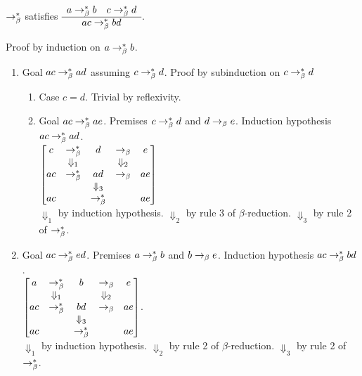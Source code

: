 \begin{theorem}
  $\to^*_\beta$ satisfies
  $\begin{array}{c} 
    a\to^*_\beta b \quad
    c \to^*_\beta d \\ \hline ac \to^*_\beta bd\end{array}$.

Proof by induction on $a \to^*_\beta b$.
\begin{enumerate}
\item
  Goal $ac \to^*_\beta ad$ assuming $c  \to^*_\beta d$.
  Proof by subinduction on $c \to^*_\beta d$
  \begin{enumerate}
  \item
    Case $c = d$. Trivial by reflexivity.
  \item
    Goal $ac \to^*_\beta ae$.
    Premises $c \to^*_\beta d$ and $d \to_\beta e$.
    Induction hypothesis $ac \to^*_\beta ad$.\\
    $\begin{bmatrix}
      c   & \to^*_\beta      &  d     & \to_\beta            &   e   \\
           & \Downarrow_1 &         & \Downarrow_2 &        \\
      ac & \to^*_\beta      &  ad   & \to_\beta             &   ae \\
          &                         & \Downarrow_3 &          &        \\
      ac &                        & \to^*_\beta   &              &   ae
    \end{bmatrix}$\\
    $\Downarrow_1$ by induction hypothesis.
    $\Downarrow_2$ by rule 3 of $\beta$-reduction.
    $\Downarrow_3$ by rule 2 of $\to^*_\beta$.
  \end{enumerate}
\item
  Goal $ac \to^*_\beta ed$.
  Premises $a \to^*_\beta b$ and $b\to_\beta e$.
  Induction hypothesis $ac \to^*_\beta bd$.\\
    $\begin{bmatrix}
      a   & \to^*_\beta      &  b     & \to_\beta            &   e   \\
           & \Downarrow_1 &         & \Downarrow_2 &        \\
      ac & \to^*_\beta      & bd    & \to_\beta            &   ae \\
           &                        & \Downarrow_3 &         &        \\
      ac &                         & \to^*_\beta   &           &   ae
    \end{bmatrix}$.\\
    $\Downarrow_1$ by induction hypothesis.
    $\Downarrow_2$ by rule 2 of $\beta$-reduction.
    $\Downarrow_3$ by rule 2 of $\to^*_\beta$.
  \end{enumerate}
\end{theorem}

